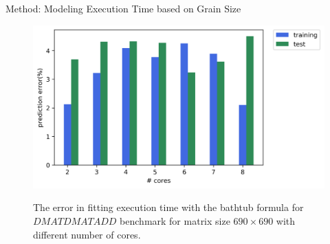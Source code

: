 \documentclass[10pt]{beamer}
\begin{document}
\begin{frame}{Method: Modeling Execution Time based on Grain Size}
	\begin{outline}	
\begin{figure}[H]
	\centering
	{\includegraphics[scale=.45]{images/bathtub/error_690.png}}	
	\caption{The error in fitting execution time with the bathtub formula for $DMATDMATADD$ benchmark for matrix size $690\times690$ with different number of cores.}	
	\label{fig23}
\end{figure}
\end{outline}
\end{frame}
\end{document}
